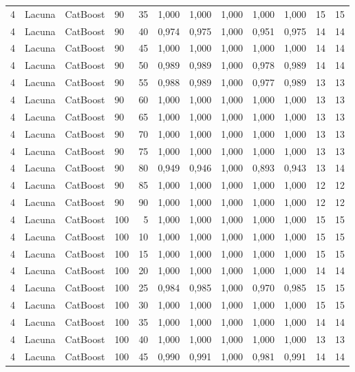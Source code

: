 \begin{longtable}{ccclrrrrrrrr}
4 & Lacuna & CatBoost & 90 & 35 & 1,000 & 1,000 & 1,000 & 1,000 & 1,000 & 15 & 15 \\
4 & Lacuna & CatBoost & 90 & 40 & 0,974 & 0,975 & 1,000 & 0,951 & 0,975 & 14 & 14 \\
4 & Lacuna & CatBoost & 90 & 45 & 1,000 & 1,000 & 1,000 & 1,000 & 1,000 & 14 & 14 \\
4 & Lacuna & CatBoost & 90 & 50 & 0,989 & 0,989 & 1,000 & 0,978 & 0,989 & 14 & 14 \\
4 & Lacuna & CatBoost & 90 & 55 & 0,988 & 0,989 & 1,000 & 0,977 & 0,989 & 13 & 13 \\
4 & Lacuna & CatBoost & 90 & 60 & 1,000 & 1,000 & 1,000 & 1,000 & 1,000 & 13 & 13 \\
4 & Lacuna & CatBoost & 90 & 65 & 1,000 & 1,000 & 1,000 & 1,000 & 1,000 & 13 & 13 \\
4 & Lacuna & CatBoost & 90 & 70 & 1,000 & 1,000 & 1,000 & 1,000 & 1,000 & 13 & 13 \\
4 & Lacuna & CatBoost & 90 & 75 & 1,000 & 1,000 & 1,000 & 1,000 & 1,000 & 13 & 13 \\
4 & Lacuna & CatBoost & 90 & 80 & 0,949 & 0,946 & 1,000 & 0,893 & 0,943 & 13 & 14 \\
4 & Lacuna & CatBoost & 90 & 85 & 1,000 & 1,000 & 1,000 & 1,000 & 1,000 & 12 & 12 \\
4 & Lacuna & CatBoost & 90 & 90 & 1,000 & 1,000 & 1,000 & 1,000 & 1,000 & 12 & 12 \\
4 & Lacuna & CatBoost & 100 & 5 & 1,000 & 1,000 & 1,000 & 1,000 & 1,000 & 15 & 15 \\
4 & Lacuna & CatBoost & 100 & 10 & 1,000 & 1,000 & 1,000 & 1,000 & 1,000 & 15 & 15 \\
4 & Lacuna & CatBoost & 100 & 15 & 1,000 & 1,000 & 1,000 & 1,000 & 1,000 & 15 & 15 \\
4 & Lacuna & CatBoost & 100 & 20 & 1,000 & 1,000 & 1,000 & 1,000 & 1,000 & 14 & 14 \\
4 & Lacuna & CatBoost & 100 & 25 & 0,984 & 0,985 & 1,000 & 0,970 & 0,985 & 15 & 15 \\
4 & Lacuna & CatBoost & 100 & 30 & 1,000 & 1,000 & 1,000 & 1,000 & 1,000 & 15 & 15 \\
4 & Lacuna & CatBoost & 100 & 35 & 1,000 & 1,000 & 1,000 & 1,000 & 1,000 & 14 & 14 \\
4 & Lacuna & CatBoost & 100 & 40 & 1,000 & 1,000 & 1,000 & 1,000 & 1,000 & 13 & 13 \\
4 & Lacuna & CatBoost & 100 & 45 & 0,990 & 0,991 & 1,000 & 0,981 & 0,991 & 14 & 14 \\

\end{longtable}

